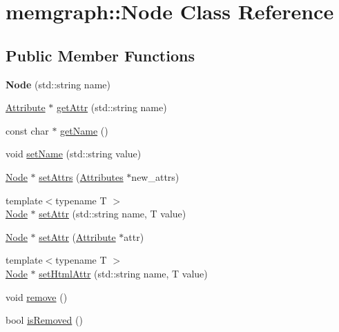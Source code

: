 \hypertarget{classmemgraph_1_1_node}{}\section{memgraph\+:\+:Node Class Reference}
\label{classmemgraph_1_1_node}
\subsection*{Public Member Functions}
\begin{DoxyCompactItemize}
\item 
{\bfseries Node} (std\+::string name)\hypertarget{classmemgraph_1_1_node_a01141770a5ada97efa00e1cca55eeec1}{}\label{classmemgraph_1_1_node_a01141770a5ada97efa00e1cca55eeec1}

\item 
\hyperlink{classmemgraph_1_1_attribute}{Attribute} $\ast$ \hyperlink{classmemgraph_1_1_node_afe43b085debdabff8e011bcb428f32dd}{get\+Attr} (std\+::string name)
\item 
const char $\ast$ \hyperlink{classmemgraph_1_1_node_ad58f5abebbbdcd3b4a6887db4a6795ac}{get\+Name} ()
\item 
void \hyperlink{classmemgraph_1_1_node_a56a16923b309275bd4b09276a60df757}{set\+Name} (std\+::string value)
\item 
\hyperlink{classmemgraph_1_1_node}{Node} $\ast$ \hyperlink{classmemgraph_1_1_node_a466d57ad274a8b8e27cb3c5b94f59b6e}{set\+Attrs} (\hyperlink{classmemgraph_1_1_attributes}{Attributes} $\ast$new\+\_\+attrs)
\item 
{\footnotesize template$<$typename T $>$ }\\\hyperlink{classmemgraph_1_1_node}{Node} $\ast$ \hyperlink{classmemgraph_1_1_node_ac031d8b7539b062fa9f1a6ac3147c2ca}{set\+Attr} (std\+::string name, T value)
\item 
\hyperlink{classmemgraph_1_1_node}{Node} $\ast$ \hyperlink{classmemgraph_1_1_node_ac5a98da29437d07a2b1c2de642e202b9}{set\+Attr} (\hyperlink{classmemgraph_1_1_attribute}{Attribute} $\ast$attr)
\item 
{\footnotesize template$<$typename T $>$ }\\\hyperlink{classmemgraph_1_1_node}{Node} $\ast$ \hyperlink{classmemgraph_1_1_node_a07417cf0d0ac442481f48164e1145152}{set\+Html\+Attr} (std\+::string name, T value)
\item 
void \hyperlink{classmemgraph_1_1_node_ac4f83ea888804eca40dc1b0145948312}{remove} ()
\item 
bool \hyperlink{classmemgraph_1_1_node_a300c2c5bea84064efe6b43bf0e37cf35}{is\+Removed} ()
\end{DoxyCompactItemize}
